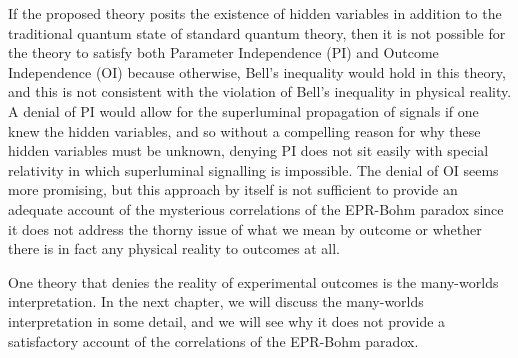 If the proposed theory posits the existence of hidden variables in addition to the traditional quantum state of standard quantum theory, then it is not possible for the theory to satisfy both Parameter Independence (PI) and Outcome Independence (OI) because otherwise, Bell's inequality would hold in this theory, and this is not consistent with the violation of Bell's inequality in physical reality. A denial of PI would allow for the superluminal propagation of signals if one knew the hidden variables, and so without a compelling reason for why these hidden variables must be  unknown, denying PI does not sit easily with special relativity in which superluminal signalling is impossible. The denial of OI seems more promising, but this approach by itself is not sufficient to provide an adequate account of the mysterious correlations of the EPR-Bohm paradox since it does not address the thorny issue of what we mean by outcome or whether there is in fact any physical reality to outcomes at all. 

One theory that denies the reality of experimental outcomes is the many-worlds interpretation. In the next chapter, we will discuss the many-worlds interpretation in some detail, and we will see why it does not provide a satisfactory account of the correlations of the EPR-Bohm paradox. 